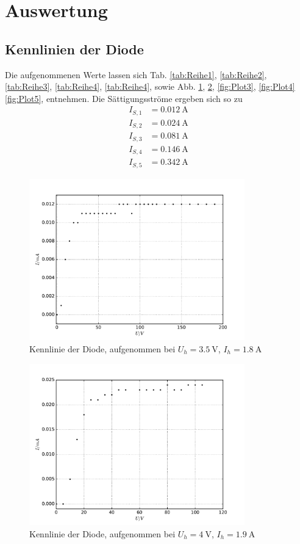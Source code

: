 \section{Auswertung}
\label{sec:Auswertung}
\subsection{Kennlinien der Diode}
Die aufgenommenen Werte lassen sich Tab. \ref{tab:Reihe1}, \ref{tab:Reihe2}, \ref{tab:Reihe3}, \ref{tab:Reihe4}, \ref{tab:Reihe4}, sowie Abb. \ref{fig:Plot1}, \ref{fig:Plot2}, \ref{fig:Plot3}, \ref{fig:Plot4} \ref{fig:Plot5}, entnehmen. Die Sättigungsströme ergeben sich so zu
\begin{align*}
  I_{S,1} &= \SI{0.012}{\ampere} \\
  I_{S,2} &= \SI{0.024}{\ampere} \\
  I_{S,3} &= \SI{0.081}{\ampere} \\
  I_{S,4} &= \SI{0.146}{\ampere} \\
  I_{S,5} &= \SI{0.342}{\ampere}
\end{align*}
\begin{figure}
  \centering
  \includegraphics[height=7cm]{./plots/Plot1.pdf}
  \caption{Kennlinie der Diode, aufgenommen bei $U_h = \SI{3.5}{\volt}$, $I_h = \SI{1.8}{\ampere}$}
  \label{fig:Plot1}
\end{figure}

\begin{figure}
  \centering
  \includegraphics[height=7cm]{./plots/Plot2.pdf}
  \caption{Kennlinie der Diode, aufgenommen bei $U_h = \SI{4}{\volt}$, $I_h = \SI{1.9}{\ampere}$}
  \label{fig:Plot2}
\end{figure}

